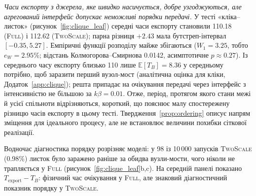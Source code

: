 \documentclass[a4paper,fleqn]{cas-sc}
\newcommand{\Full}{\textup{\textsc{Full}}}
\newcommand{\TS}{\textup{\textsc{TwoScale}}}
\newcommand{\eW}{e_{W}}
\begin{document}
\emph{Часи експорту з джерела, яке швидко насичується, добре узгоджуються, але агрегований інтерфейс допускає неможливі порядки передачі.} У тесті «кліка--листок» (рисунок~\ref{fig:clique_leaf}) середні часи експорту становили 110.18 (\Full{}) і 112.62 (\TS{}); парна різниця $+2.43$ мала бутстреп-інтервал $[-0.35,5.27]$. Емпіричні функції розподілу майже збігаються ($W_1=3.25$, тобто $\eW=2.95\%$; відстань Колмогорова--Смирнова 0.0142, асимптотичне $p\approx0.27$). Із середнього часу експорту близько 110 лише $\mathbb{E}[T_B]=8.36$ у середньому потрібно, щоб заразити перший вузол-мост (аналітична оцінка для кліки, Додаток~\ref*{app:clique}); решта припадає на очікування передачі через інтерфейс з інтенсивністю не більшою за $k\beta=0.01$. Отже, період, протягом якого стани межі й усієї спільноти відрізняються, короткий, що пояснює малу спостережену різницю часів експорту в цьому тесті. Твердження~\ref{prop:ordering} описує напрям зміщення для ідеального процесу, але не встановлює величини похибки сіткової реалізації.

Водночас діагностика порядку розрізняє моделі: у 98 із 10\,000 запусків \TS{} (0.98\%) листок було заражено раніше за обидва вузли-мости, чого ніколи не трапляється у \Full{} (рисунок~\ref{fig:clique_leaf}b,c). На середній панелі показано $T_{\mathrm{export}}-T_B$: фізичний час очікування у \Full{}, але знаковий діагностичний показник порядку у \TS{}.
\end{document}
